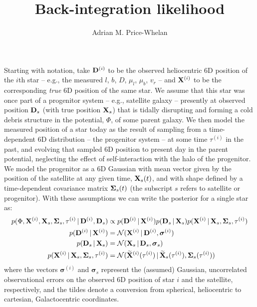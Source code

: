 \documentclass[letterpaper,12pt,preprint]{aastex}
\newcommand{\given}{\,|\,}
\newcommand{\D}{{\bf D}}
\newcommand{\X}{{\bf X}}
\newcommand{\bSigma}{{\bf \Sigma}}
\newcommand{\bsigma}{\boldsymbol\sigma}
\begin{document}
\title{Back-integration likelihood}
\author{Adrian M. Price-Whelan}

Starting with notation, take ${\bf D}^{(i)}$ to be the observed heliocentric 6D position of the $i$th star -- e.g., the measured $l$, $b$, $D$, $\mu_l$, $\mu_b$, $v_r$ -- and ${\bf X}^{(i)}$ to be the corresponding \emph{true} 6D position of the same star. We assume that this star was once part of a progenitor system -- e.g., satellite galaxy -- presently at observed position ${\bf D}_s$ (with true position ${\bf X}_s$) that is tidally disrupting and forming a cold debris structure in the potential, $\Phi$, of some parent galaxy. We then model the measured position of a star today as the result of sampling from a time-dependent 6D distribution -- the progenitor system -- at some time $\tau^{(i)}$ in the past, and evolving that sampled 6D position to present day in the parent potential, neglecting the effect of self-interaction with the halo of the progenitor. We model the progenitor as a 6D Gaussian with mean vector given by the position of the satellite at any given time, ${\bf X}_s(t)$, and with shape defined by a time-dependent covariance matrix $\bSigma_s(t)$ (the subscript $s$ refers to satellite or progenitor). With these assumptions we can write the posterior for a single star as:
\begin{align}
	p(\Phi, \X^{(i)}, \X_s, \bSigma_s, \tau^{(i)} \given \D^{(i)}, \D_s) &\propto 
		p(\D^{(i)} \given \X^{(i)}) p(\D_s \given \X_s) p(\X^{(i)} \given \X_s, \bSigma_s, \tau^{(i)})\\
	p(\D^{(i)} \given \X^{(i)}) &= \mathcal{N}(\X^{(i)} \given \D^{(i)}, \bsigma^{(i)})\\
	p(\D_s \given \X_s) &= \mathcal{N}(\X_s \given \D_s, \bsigma_s)\\
	p(\X^{(i)} \given \X_s, \bSigma_s, \tau^{(i)}) &= \mathcal{N}(\widetilde{\X}^{(i)}(\tau^{(i)}) \given \widetilde{\X}_s(\tau^{(i)}), \bSigma_s(\tau^{(i)}))
\end{align}
where the vectors $\bsigma^{(i)}$ and $\bsigma_s$ represent the (assumed) Gaussian, uncorrelated observational errors on the observed 6D position of star $i$ and the satellite, respectively, and the tildes denote a conversion from spherical, heliocentric to cartesian, Galactocentric coordinates. 
\end{document}
